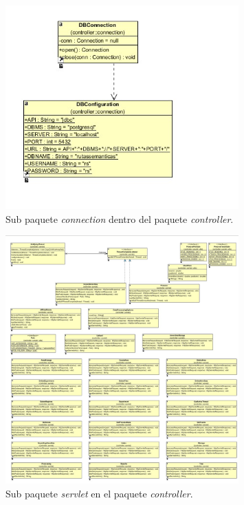 \begin{figure}[!htbp]
  \centering
    \includegraphics[width=0.8\textwidth]{../img/diagramas/controller/conexion/uno.jpg}
  \caption{Sub paquete \textit{connection} dentro del paquete \textit{controller}.}
  \label{connection}
\end{figure}

\begin{figure}[!htbp]
  \centering
    \includegraphics[width=0.8\textwidth]{../img/diagramas/controller/servlet/cuatro.jpg}
  \caption{Sub paquete \textit{servlet} en el paquete \textit{controller}.}
  \label{servlet}
\end{figure}


